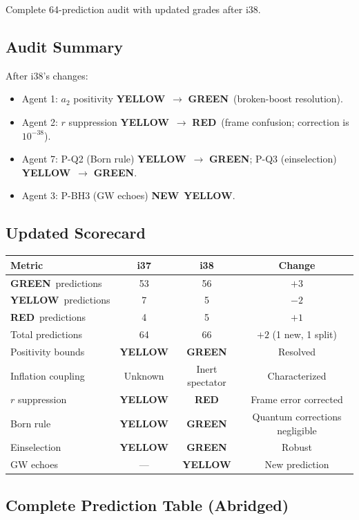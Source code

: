 \documentclass[11pt,a4paper]{article}
\newcommand{\GREEN}{\textcolor{dfdgreen}{\textbf{GREEN}}}
\newcommand{\YELLOW}{\textcolor{dfdyellow}{\textbf{YELLOW}}}
\newcommand{\RED}{\textcolor{dfdred}{\textbf{RED}}}
\newcommand{\NEW}{\textcolor{dfdblue}{\textbf{NEW}}}
\begin{document}
Complete 64-prediction audit with updated grades after i38.

\subsection{Audit Summary}

After i38's changes:
\begin{itemize}
\item Agent 1: $a_2$ positivity \YELLOW\ $\to$ \GREEN\ (broken-boost resolution).
\item Agent 2: $r$ suppression \YELLOW\ $\to$ \RED\ (frame confusion; correction is $10^{-38}$).
\item Agent 7: P-Q2 (Born rule) \YELLOW\ $\to$ \GREEN; P-Q3 (einselection) \YELLOW\ $\to$ \GREEN.
\item Agent 3: P-BH3 (GW echoes) \NEW\ \YELLOW.
\end{itemize}

\subsection{Updated Scorecard}

\begin{center}
\begin{tabular}{lccc}
\toprule
\textbf{Metric} & \textbf{i37} & \textbf{i38} & \textbf{Change} \\
\midrule
\GREEN\ predictions & 53 & 56 & $+3$ \\
\YELLOW\ predictions & 7 & 5 & $-2$ \\
\RED\ predictions & 4 & 5 & $+1$ \\
Total predictions & 64 & 66 & $+2$ (1 new, 1 split) \\
\midrule
Positivity bounds & \YELLOW & \GREEN & Resolved \\
Inflation coupling & Unknown & Inert spectator & Characterized \\
$r$ suppression & \YELLOW & \RED & Frame error corrected \\
Born rule & \YELLOW & \GREEN & Quantum corrections negligible \\
Einselection & \YELLOW & \GREEN & Robust \\
GW echoes & --- & \YELLOW & New prediction \\
\bottomrule
\end{tabular}
\end{center}

\subsection{Complete Prediction Table (Abridged)}
\end{document}
